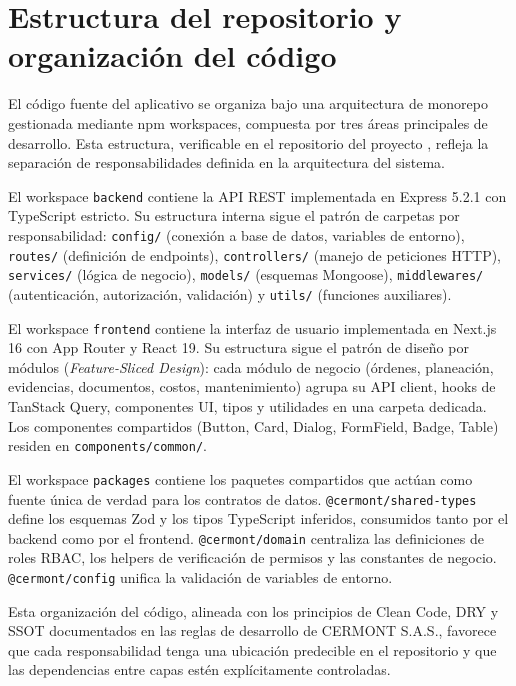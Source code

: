 \section{Estructura del repositorio y organización del código}
\label{sec:estructura-repositorio}

El código fuente del aplicativo se organiza bajo una arquitectura de monorepo gestionada mediante npm workspaces, compuesta por tres áreas principales de desarrollo. Esta estructura, verificable en el repositorio del proyecto \cite{repo_cermont}, refleja la separación de responsabilidades definida en la arquitectura del sistema.

El workspace \texttt{backend} contiene la API REST implementada en Express 5.2.1 con TypeScript estricto. Su estructura interna sigue el patrón de carpetas por responsabilidad: \texttt{config/} (conexión a base de datos, variables de entorno), \texttt{routes/} (definición de endpoints), \texttt{controllers/} (manejo de peticiones HTTP), \texttt{services/} (lógica de negocio), \texttt{models/} (esquemas Mongoose), \texttt{middlewares/} (autenticación, autorización, validación) y \texttt{utils/} (funciones auxiliares).

El workspace \texttt{frontend} contiene la interfaz de usuario implementada en Next.js 16 con App Router y React 19. Su estructura sigue el patrón de diseño por módulos (\textit{Feature-Sliced Design}): cada módulo de negocio (órdenes, planeación, evidencias, documentos, costos, mantenimiento) agrupa su API client, hooks de TanStack Query, componentes UI, tipos y utilidades en una carpeta dedicada. Los componentes compartidos (Button, Card, Dialog, FormField, Badge, Table) residen en \texttt{components/common/}.

El workspace \texttt{packages} contiene los paquetes compartidos que actúan como fuente única de verdad para los contratos de datos. \texttt{@cermont/shared-types} define los esquemas Zod y los tipos TypeScript inferidos, consumidos tanto por el backend como por el frontend. \texttt{@cermont/domain} centraliza las definiciones de roles RBAC, los helpers de verificación de permisos y las constantes de negocio. \texttt{@cermont/config} unifica la validación de variables de entorno.

Esta organización del código, alineada con los principios de Clean Code, DRY y SSOT documentados en las reglas de desarrollo de CERMONT S.A.S., favorece que cada responsabilidad tenga una ubicación predecible en el repositorio y que las dependencias entre capas estén explícitamente controladas.

